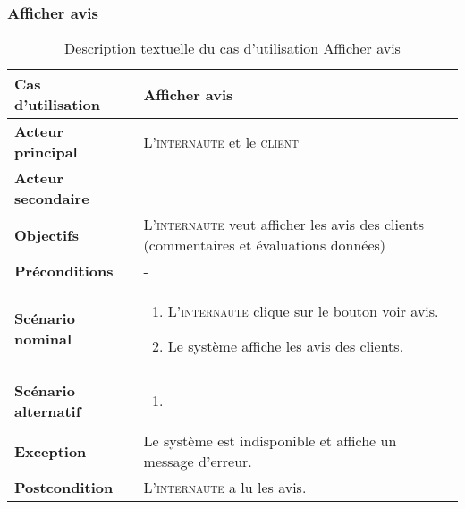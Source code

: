        \subsubsection[Consulter avis]{Afficher avis}
            \begin{longtable}{p{4cm} p{9cm}}
                \caption{Description textuelle du cas d’utilisation Afficher avis}
                \label{table:usecaseConsulterAvis}
                \\\hline\hline
                    \textbf{Cas d’utilisation} & \textbf{Afficher avis}
                \\\hline\hline
                        \textbf{Acteur principal} & L’\textsc{internaute} et le \textsc{client}
                    \\
                        \textbf{Acteur secondaire} & -
                    \\
                        \textbf{Objectifs} & L’\textsc{internaute} veut afficher les
                        avis des clients (commentaires et évaluations données)
                    \\
                        \textbf{Préconditions} & -
                    \\
                    \textbf{Scénario nominal} &
                        \begin{enumerate}[leftmargin=*]
                            \item L’\textsc{internaute} clique sur le bouton
                            voir avis.
                            \item Le système affiche les avis des clients.
                        \end{enumerate}
                    \\
                    \textbf{Scénario alternatif} &
                        \begin{enumerate}[leftmargin=*]
                            \item -
                        \end{enumerate}
                    \\
                    \textbf{Exception} & Le système est indisponible et affiche un message d’erreur.
                    \\
                    \textbf{Postcondition} & L’\textsc{internaute} a lu les avis.
                \\\bottomrule
            \end{longtable}

